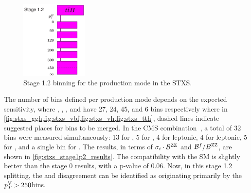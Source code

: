 \begin{figure}
  \centering
  \includegraphics[width=0.3\textwidth]{Figures/Theory/Higgs/STXS/simplifiedXS_ttH_1_2.pdf}
  \caption[Stage 1.2 \ttH Binning in the STXS]{Stage 1.2 binning for the \ttH production mode in the STXS.}\label{fig:stxs_tth}
\end{figure}

The number of bins defined per production mode depends on the expected sensitivity, where \ggH, \qqH, \VH, and \ttH have 27, 24, 45, and 6 bins respectively where in \cref{fig:stxs_ggh,fig:stxs_vbf,fig:stxs_vh,fig:stxs_tth}, dashed lines indicate suggested places for bins to be merged. In the CMS combination~\cite{CMS-PAS-HIG-21-018}, a total of 32 bins were measured simultaneously: 13 for \ggH, 5 for \qqH, 4 for \WH leptonic, 4 for \ZH leptonic, 5 for \ttH, and a single bin for \tH. The results, in terms of $\sigma_i \cdot \mathcal{B}^{\mathrm{Z}\mathrm{Z}}$ and $\mathcal{B}^f / B^{\mathrm{Z}\mathrm{Z}}$, are shown in \cref{fig:stxs_stage1p2_results}. The compatibility with the SM is slightly better than the stage 0 results, with a p-value of 0.06. Now, in this stage 1.2 splitting, the \WH and \ZH disagreement can be identified as originating primarily by the $p_T^\mathrm{V} > 250$\GeV bins. 

